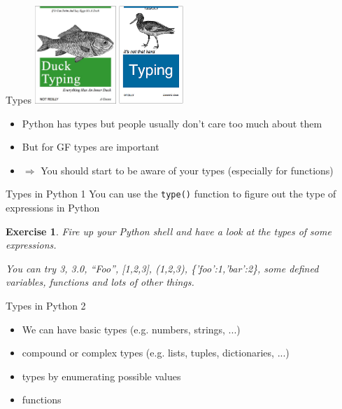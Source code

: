 \documentclass{beamer}
\newtheorem{exercise}{Exercise}
\begin{document}
\begin{frame}{Types}
  \includegraphics[height=10em]{types1}
  \includegraphics[height=10em]{types2}
  \begin{itemize}
  \item Python has types but people usually don't care too much about them
  \item But for GF types are important
  \item $\Rightarrow$ You should start to be aware of your types (especially for functions)
  \end{itemize}
\end{frame}
\begin{frame}{Types in Python 1}
 You can use the \texttt{type()} function to figure out the type of expressions in Python
 \begin{exercise}
   Fire up your Python shell and have a look at the types of some expressions.

   You can try 3, 3.0, ``Foo'', [1,2,3], (1,2,3), \{'foo':1,'bar':2\}, some defined variables, functions and lots of other things.
 \end{exercise}
\end{frame}
\begin{frame}{Types in Python 2}
  \begin{itemize}
  \item We can have basic types (e.g. numbers, strings, ...)
  \item compound or complex types (e.g. lists, tuples, dictionaries, ...)
  \item types by enumerating possible values
  \item functions
  \end{itemize}
  
\end{frame}
\end{document}
